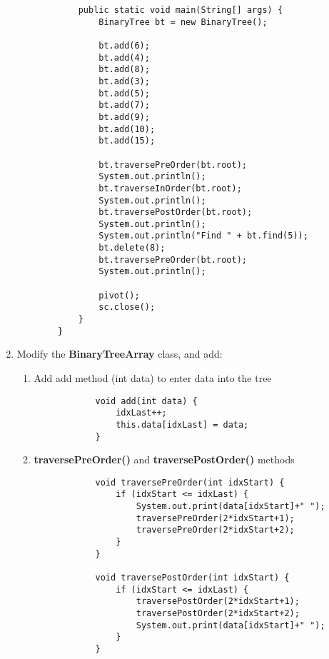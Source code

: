 \documentclass[12pt,titlepage]{article}
\begin{document}
\begin{enumerate}
\begin{verbatim}
            public static void main(String[] args) {
                BinaryTree bt = new BinaryTree();

                bt.add(6);
                bt.add(4);
                bt.add(8);
                bt.add(3);
                bt.add(5);
                bt.add(7);
                bt.add(9);
                bt.add(10);
                bt.add(15);

                bt.traversePreOrder(bt.root);
                System.out.println();
                bt.traverseInOrder(bt.root);
                System.out.println();
                bt.traversePostOrder(bt.root);
                System.out.println();
                System.out.println("Find " + bt.find(5));
                bt.delete(8);
                bt.traversePreOrder(bt.root);
                System.out.println();

                pivot();
                sc.close();
            }
        }
    \end{verbatim}
    \item Modify the \textbf{BinaryTreeArray} class, and add:
    \begin{enumerate}[label=\alph*.]
        \item Add add method (int data) to enter data into the tree
        \begin{verbatim}
            void add(int data) {
                idxLast++;
                this.data[idxLast] = data;
            }
        \end{verbatim}
        \item \textbf{traversePreOrder()} and \textbf{traversePostOrder()} methods
        \begin{verbatim}
            void traversePreOrder(int idxStart) {
                if (idxStart <= idxLast) {
                    System.out.print(data[idxStart]+" ");
                    traversePreOrder(2*idxStart+1);
                    traversePreOrder(2*idxStart+2);
                }
            }

            void traversePostOrder(int idxStart) {
                if (idxStart <= idxLast) {
                    traversePostOrder(2*idxStart+1);
                    traversePostOrder(2*idxStart+2);
                    System.out.print(data[idxStart]+" ");
                }
            }
        \end{verbatim}
    \end{enumerate}
\end{enumerate}
\end{document}
